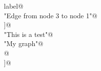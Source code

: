 \documentclass[a4paper]{report}
\begin{document}
\begin{flushleft}
\begin{minipage}{\linewidth}
\begin{list}{}{}
\mbox{} label@\\
\mbox{}\verb@"Edge from node 3 to node 1"@\\
\mbox{}\verb@]@\\
\mbox{}\verb@comment "This is a test"@\\
\mbox{}\verb@label "My graph"@\\
\mbox{}@\\
\mbox{}\verb@]@\\
\mbox{}\verb@@{\NWsep}
\end{list}
\vspace{-1.5ex}
\footnotesize
\begin{list}{}{\setlength{\itemsep}{-\parsep}\setlength{\itemindent}{-\leftmargin}}

\item{}
\end{list}
\end{minipage}\vspace{4ex}
\end{flushleft}
\end{document}
